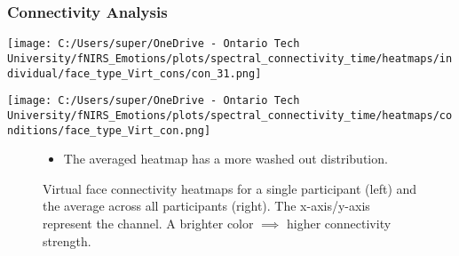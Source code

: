 \documentclass{beamer}
\begin{document}
\begin{frame}
    \frametitle{Connectivity Analysis}
    \begin{minipage}[t]{0.49\textwidth}
        \vspace{-\baselineskip}
        \texttt{[image: C:/Users/super/OneDrive - Ontario Tech University/fNIRS\_Emotions/plots/spectral\_connectivity\_time/heatmaps/individual/face\_type\_Virt\_cons/con\_31.png]}
        \end{minipage}
        \begin{minipage}[t]{0.49\textwidth}
        \vspace{-\baselineskip}
        \texttt{[image: C:/Users/super/OneDrive - Ontario Tech University/fNIRS\_Emotions/plots/spectral\_connectivity\_time/heatmaps/conditions/face\_type\_Virt\_con.png]}
    \end{minipage}
    \begin{figure}
        \caption{Virtual face connectivity heatmaps for a single participant (left) and the average across all participants (right).
        The x-axis/y-axis represent the channel. A brighter color \(\implies\) higher connectivity strength.}
        \begin{itemize}
            \item The averaged heatmap has a more washed out distribution.
        \end{itemize}
    \end{figure}
\end{frame}
\end{document}
